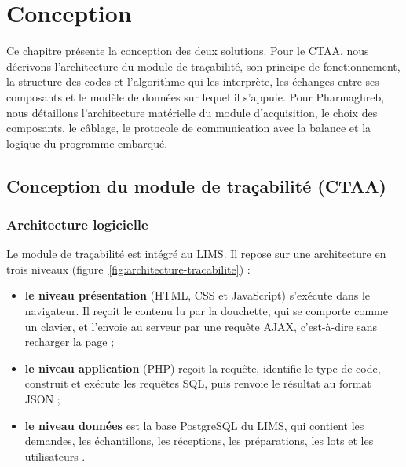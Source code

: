 \chapter{Conception}
\label{chap:conception}

Ce chapitre présente la conception des deux solutions. Pour le \ac{CTAA}, nous décrivons l'architecture du module de traçabilité, son principe de fonctionnement, la structure des codes et l'algorithme qui les interprète, les échanges entre ses composants et le modèle de données sur lequel il s'appuie. Pour Pharmaghreb, nous détaillons l'architecture matérielle du module d'acquisition, le choix des composants, le câblage, le protocole de communication avec la balance et la logique du programme embarqué.

\section{Conception du module de traçabilité (CTAA)}

\subsection{Architecture logicielle}

Le module de traçabilité est intégré au \ac{LIMS}. Il repose sur une architecture en trois niveaux (figure~\ref{fig:architecture-tracabilite}) :
\begin{itemize}
    \item \textbf{le niveau présentation} (\ac{HTML}, CSS et JavaScript) s'exécute dans le navigateur. Il reçoit le contenu lu par la douchette, qui se comporte comme un clavier, et l'envoie au serveur par une requête \ac{AJAX}, c'est-à-dire sans recharger la page ;
    \item \textbf{le niveau application} (\ac{PHP}) reçoit la requête, identifie le type de code, construit et exécute les requêtes \ac{SQL}, puis renvoie le résultat au format \ac{JSON} \citep{php} ;
    \item \textbf{le niveau données} est la base PostgreSQL du \ac{LIMS}, qui contient les demandes, les échantillons, les réceptions, les préparations, les lots et les utilisateurs \citep{postgresql}.
\end{itemize}


